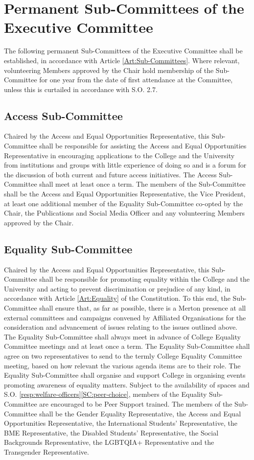 \section{Permanent Sub-Committees of the Executive Committee}
\npara The following permanent Sub-Committees of the Executive Committee shall be established, in accordance with Article \ref{Art:Sub-Committees}.
\npara Where relevant, volunteering Members approved by the Chair hold membership of the Sub-Committee for one year from the date of first attendance at the Committee, unless this is curtailed in accordance with S.O. 2.7.
\subsection{Access Sub-Committee}
\npara Chaired by the Access and Equal Opportunities Representative, this Sub-Committee shall be responsible for assisting the Access and Equal Opportunities Representative in encouraging applications to the College and the University from institutions and groups with little experience of doing so and is a forum for the discussion of both current and future access initiatives.
\npara The Access Sub-Committee shall meet at least once a term.
\npara The members of the Sub-Committee shall be the Access and Equal Opportunities Representative, the Vice President, at least one additional member of the Equality Sub-Committee co-opted by the Chair, the Publications and Social Media Officer and any volunteering Members approved by the Chair.
\subsection{Equality Sub-Committee}
\npara Chaired by the Access and Equal Opportunities Representative, this Sub-Committee shall be responsible for promoting equality within the College and the University and acting to prevent discrimination or prejudice of any kind, in accordance with Article \ref{Art:Equality} of the Constitution. To this end, the Sub-Committee shall ensure that, as far as possible, there is a Merton presence at all external committees and campaigns convened by Affiliated Organisations for the consideration and advancement of issues relating to the issues outlined above.
\npara The Equality Sub-Committee shall always meet in advance of College Equality Committee meetings and at least once a term.
\npara The Equality Sub-Committee shall agree on two representatives to send to the termly College Equality Committee meeting, based on how relevant the various agenda items are to their role.
\npara The Equality Sub-Committee shall organise and support College in organising events promoting awareness of equality matters.
\npara Subject to the availability of spaces and S.O. \ref{resp:welfare-officers}\ref{SC:peer-choice}, members of the Equality Sub-Committee are encouraged to be Peer Support trained.
\npara The members of the Sub-Committee shall be the Gender Equality Representative, the Access and Equal Opportunities Representative, the International Students’ Representative, the BME Representative, the Disabled Students’ Representative, the Social Backgrounds Representative, the LGBTQIA+ Representative and the Transgender Representative.
